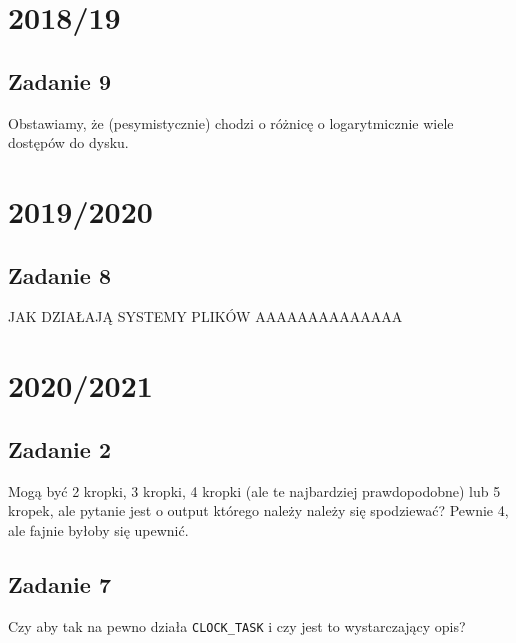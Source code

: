 \section{2018/19}
\subsection{Zadanie 9}
Obstawiamy, że (pesymistycznie) chodzi o różnicę o logarytmicznie wiele dostępów do dysku.

\section{2019/2020}
\subsection{Zadanie 8}
JAK DZIAŁAJĄ SYSTEMY PLIKÓW AAAAAAAAAAAAAA

\section{2020/2021}
\subsection{Zadanie 2}
Mogą być 2 kropki, 3 kropki, 4 kropki (ale te najbardziej prawdopodobne) lub 5 kropek, ale pytanie jest o output którego należy należy się spodziewać? Pewnie 4, ale fajnie byłoby się upewnić.

\subsection{Zadanie 7}
Czy aby tak na pewno działa \texttt{CLOCK\_TASK} i czy jest to wystarczający opis?

